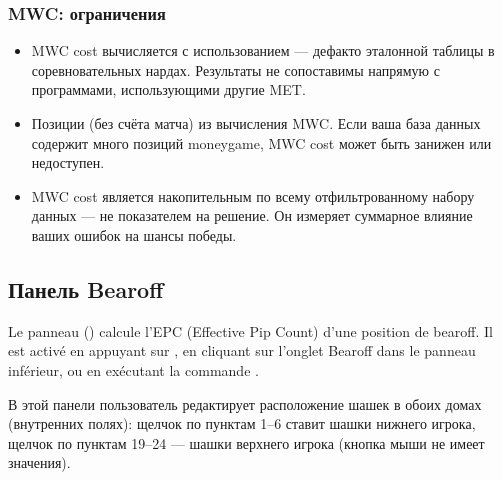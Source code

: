 \documentclass[letterpaper,10pt,russian]{sphinxmanual}
\begin{document}
\subsubsection{MWC: ограничения}
\label{\detokenize{manuel:mwc-limitations}}\begin{itemize}
\item {} 
\sphinxAtStartPar
MWC cost вычисляется с использованием  — де\sphinxhyphen{}факто эталонной таблицы в соревновательных нардах. Результаты не сопоставимы напрямую с программами, использующими другие MET.

\item {} 
\sphinxAtStartPar
Позиции  (без счёта матча)  из вычисления MWC. Если ваша база данных содержит много позиций money\sphinxhyphen{}game, MWC cost может быть занижен или недоступен.

\item {} 
\sphinxAtStartPar
MWC cost является накопительным по всему отфильтрованному набору данных — не показателем на решение. Он измеряет суммарное влияние ваших ошибок на шансы победы.

\end{itemize}


\subsection{Панель Bearoff}
\label{\detokenize{manuel:panneau-bearoff}}\label{\detokenize{manuel:panneau-epc}}
\sphinxAtStartPar
Le panneau  () calcule l’EPC (Effective Pip Count) d’une
position de bearoff. Il est activé en appuyant sur , en cliquant sur
l’onglet Bearoff dans le panneau inférieur, ou en exécutant la commande
.

\sphinxAtStartPar
В этой панели пользователь редактирует расположение шашек в обоих домах (внутренних полях): щелчок по пунктам 1–6 ставит шашки нижнего игрока, щелчок по пунктам 19–24 — шашки верхнего игрока (кнопка мыши не имеет значения).
\end{document}
